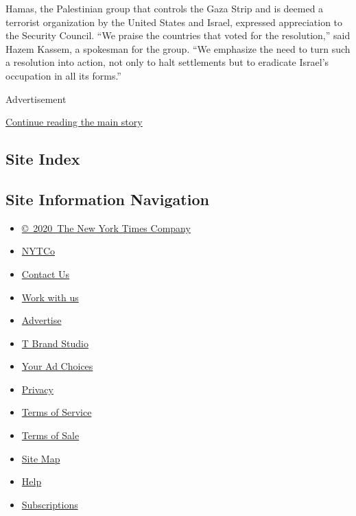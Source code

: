 Hamas, the Palestinian group that controls the Gaza Strip and is deemed
a terrorist organization by the United States and Israel, expressed
appreciation to the Security Council. ``We praise the countries that
voted for the resolution,'' said Hazem Kassem, a spokesman for the
group. ``We emphasize the need to turn such a resolution into action,
not only to halt settlements but to eradicate Israel's occupation in all
its forms.''

Advertisement

\protect\hyperlink{after-bottom}{Continue reading the main story}

\hypertarget{site-index}{%
\subsection{Site Index}\label{site-index}}

\hypertarget{site-information-navigation}{%
\subsection{Site Information
Navigation}\label{site-information-navigation}}

\begin{itemize}
\tightlist
\item
  \href{https://help.nytimes3xbfgragh.onion/hc/en-us/articles/115014792127-Copyright-notice}{©~2020~The
  New York Times Company}
\end{itemize}

\begin{itemize}
\tightlist
\item
  \href{https://www.nytco.com/}{NYTCo}
\item
  \href{https://help.nytimes3xbfgragh.onion/hc/en-us/articles/115015385887-Contact-Us}{Contact
  Us}
\item
  \href{https://www.nytco.com/careers/}{Work with us}
\item
  \href{https://nytmediakit.com/}{Advertise}
\item
  \href{http://www.tbrandstudio.com/}{T Brand Studio}
\item
  \href{https://www.nytimes3xbfgragh.onion/privacy/cookie-policy\#how-do-i-manage-trackers}{Your
  Ad Choices}
\item
  \href{https://www.nytimes3xbfgragh.onion/privacy}{Privacy}
\item
  \href{https://help.nytimes3xbfgragh.onion/hc/en-us/articles/115014893428-Terms-of-service}{Terms
  of Service}
\item
  \href{https://help.nytimes3xbfgragh.onion/hc/en-us/articles/115014893968-Terms-of-sale}{Terms
  of Sale}
\item
  \href{https://spiderbites.nytimes3xbfgragh.onion}{Site Map}
\item
  \href{https://help.nytimes3xbfgragh.onion/hc/en-us}{Help}
\item
  \href{https://www.nytimes3xbfgragh.onion/subscription?campaignId=37WXW}{Subscriptions}
\end{itemize}
